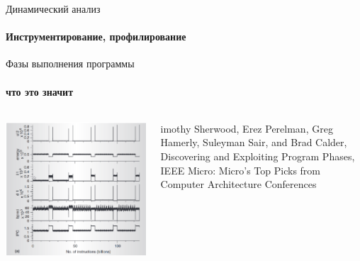 \documentclass{beamer}              %
\begin{document}
\setwatermark{}

\begin{frame}{Динамический анализ}
  \framesubtitle{Инструментирование, профилирование}
\end{frame}

\begin{frame}{Фазы выполнения программы}
  \framesubtitle{что это значит}
   
  \begin{columns}
        \includegraphics[height=.9\textheight]{img/Phases.png}

      imothy Sherwood, Erez Perelman, Greg Hamerly, Suleyman Sair, and Brad Calder, Discovering and Exploiting Program Phases, IEEE Micro: Micro's Top Picks from Computer Architecture Conferences
      
  \end{columns}		  
\end{frame}
\end{document}
